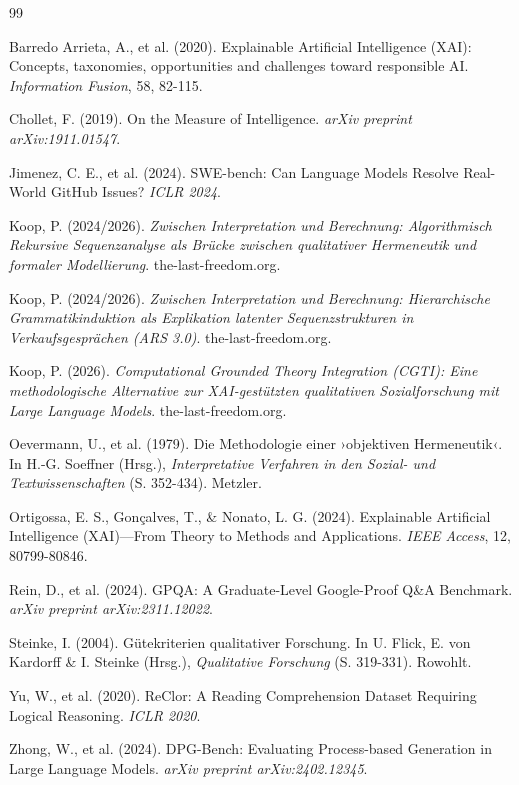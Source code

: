 \documentclass[12pt,a4paper]{article}
\begin{document}
\begin{thebibliography}{99}

Barredo Arrieta, A., et al. (2020). Explainable Artificial Intelligence (XAI): Concepts, taxonomies, opportunities and challenges toward responsible AI. \textit{Information Fusion}, 58, 82-115.

Chollet, F. (2019). On the Measure of Intelligence. \textit{arXiv preprint arXiv:1911.01547}.

Jimenez, C. E., et al. (2024). SWE-bench: Can Language Models Resolve Real-World GitHub Issues? \textit{ICLR 2024}.

Koop, P. (2024/2026). \textit{Zwischen Interpretation und Berechnung: Algorithmisch Rekursive Sequenzanalyse als Brücke zwischen qualitativer Hermeneutik und formaler Modellierung}. the-last-freedom.org.

Koop, P. (2024/2026). \textit{Zwischen Interpretation und Berechnung: Hierarchische Grammatikinduktion als Explikation latenter Sequenzstrukturen in Verkaufsgesprächen (ARS 3.0)}. the-last-freedom.org.

Koop, P. (2026). \textit{Computational Grounded Theory Integration (CGTI): Eine methodologische Alternative zur XAI-gestützten qualitativen Sozialforschung mit Large Language Models}. the-last-freedom.org.

Oevermann, U., et al. (1979). Die Methodologie einer ›objektiven Hermeneutik‹. In H.-G. Soeffner (Hrsg.), \textit{Interpretative Verfahren in den Sozial- und Textwissenschaften} (S. 352-434). Metzler.

Ortigossa, E. S., Gonçalves, T., \& Nonato, L. G. (2024). Explainable Artificial Intelligence (XAI)—From Theory to Methods and Applications. \textit{IEEE Access}, 12, 80799-80846.

Rein, D., et al. (2024). GPQA: A Graduate-Level Google-Proof Q\&A Benchmark. \textit{arXiv preprint arXiv:2311.12022}.

Steinke, I. (2004). Gütekriterien qualitativer Forschung. In U. Flick, E. von Kardorff \& I. Steinke (Hrsg.), \textit{Qualitative Forschung} (S. 319-331). Rowohlt.

Yu, W., et al. (2020). ReClor: A Reading Comprehension Dataset Requiring Logical Reasoning. \textit{ICLR 2020}.

Zhong, W., et al. (2024). DPG-Bench: Evaluating Process-based Generation in Large Language Models. \textit{arXiv preprint arXiv:2402.12345}.

\end{thebibliography}
\end{document}
